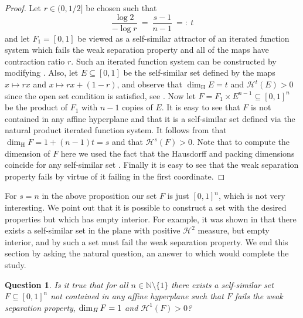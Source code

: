 \documentclass[11pt,english,british]{article}
\numberwithin{equation}{section}
\newtheorem{ques}[thm]{Question}
\begin{document}
\begin{proof}
Let $r \in (0,1/2]$ be chosen such that
\[
\frac{\log 2}{-\log r} \ = \ \frac{s-1}{n-1} \  =: \  t
\]
and let $F_1 = [0,1]$ be viewed as a self-similar attractor of an iterated function system which fails the weak separation property and all of the maps have contraction ratio $r$.  Such an iterated function system can be constructed by modifying \cite[Section 2 (v)]{bandt-graf}.  Also, let $E \subseteq [0,1]$ be the self-similar set defined by the maps $x \mapsto rx$ and $x \mapsto rx+(1-r)$, and observe that $\dim_\text{H} E = t$ and $\mathcal{H}^t(E) >0$ since the open set condition is satisfied, see \cite[Corollary 3.3]{falconer}.  Now let $F = F_1 \times E^{n-1} \subseteq [0,1]^n$ be the product of $F_1$ with $n-1$ copies of $E$.  It is easy to see that $F$ is not contained in any affine hyperplane and that it is a self-similar set defined via the natural product iterated function system.  It follows from \cite[Theorem 8.10]{mattila} that $\dim_\text{H} F = 1 + (n-1) t = s$ and that $\mathcal{H}^s (F) >0$.  Note that to compute the dimension of $F$ here we used the fact that the Hausdorff and packing dimensions coincide for any self-similar set \cite[Corollary 3.3]{techniques}.  Finally it is easy to see that the weak separation property fails by virtue of it failing in the first coordinate.
\end{proof}

For $s=n$ in the above proposition our set $F$ is just $[0,1]^n$, which is not very interesting.  We point out that it is possible to construct a set with the desired properties but which has empty interior.  For example, it was shown in \cite{jordanetal} that there exists a self-similar set in the plane with positive $\mathcal{H}^2$ measure, but empty interior, and by \cite[Theorem 3]{zerner} such a set must fail the weak separation property.  We end this section by asking the natural question, an answer to which would complete the study.
\begin{ques}
Is it true that for all $n \in \mathbb{N}\setminus \{1\}$ there exists a self-similar set $F \subseteq [0,1]^n$ not contained in any affine hyperplane such that $F$ fails the weak separation property, $\dim_\text{\emph{H}} F = 1$ and $\mathcal{H}^1 (F) >0$?
\end{ques}
\end{document}
